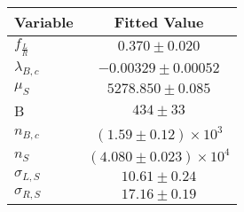 \begin{tabular}[t]{lc}
\hline
Variable &Fitted Value\\
\hline\hline
$f_{\frac{L}{R}}$&$0.370\pm0.020$\\
\hline
$\lambda_{B,c}$&$-0.00329\pm0.00052$\\
\hline
$\mu_S$&$5278.850\pm0.085$\\
\hline
B&$434\pm33$\\
\hline
$n_{B,c}$&$(1.59\pm0.12)\times 10^3$\\
\hline
$n_S$&$(4.080\pm0.023)\times 10^4$\\
\hline
$\sigma_{L, S}$&$10.61\pm0.24$\\
\hline
$\sigma_{R, S}$&$17.16\pm0.19$\\
\hline
\end{tabular}